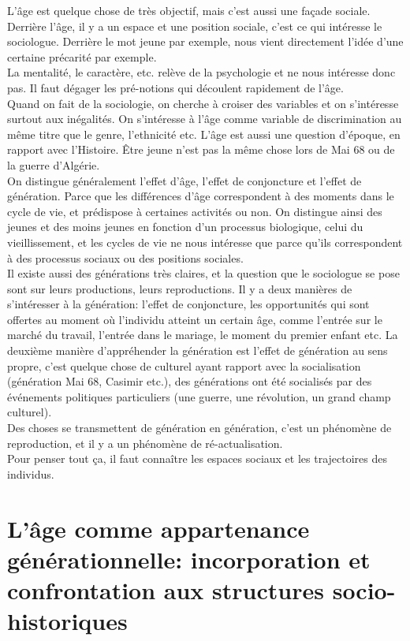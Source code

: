 \documentclass[10pt, a4paper, openany]{book}
\begin{document}
L'âge est quelque chose de très objectif, mais c'est aussi une façade sociale. Derrière l'âge, il y a un espace et une position sociale, c'est ce qui intéresse le sociologue. Derrière le mot jeune par exemple, nous vient directement l'idée d'une certaine précarité par exemple. \\
La mentalité, le caractère, etc. relève de la psychologie et ne nous intéresse donc pas. Il faut dégager les pré-notions qui découlent rapidement de l'âge. \\
Quand on fait de la sociologie, on cherche à croiser des variables et on s'intéresse surtout aux inégalités. On s'intéresse à l'âge comme variable de discrimination au même titre que le genre, l'ethnicité etc. L'âge est aussi une question d'époque, en rapport avec l'Histoire. Être jeune n'est pas la même chose lors de Mai 68 ou de la guerre d'Algérie. \\
On distingue généralement l'effet d'âge, l'effet de conjoncture et l'effet de génération. Parce que les différences d'âge correspondent à des moments dans le cycle de vie, et prédispose à certaines activités ou non. On distingue ainsi des jeunes et des moins jeunes en fonction d'un processus biologique, celui du vieillissement, et les cycles de vie ne nous intéresse que parce qu'ils correspondent à des processus sociaux ou des positions sociales. \\ 
Il existe aussi des générations très claires, et la question que le sociologue se pose sont sur leurs productions, leurs reproductions. Il y a deux manières de s'intéresser à la génération: l'effet de conjoncture, les opportunités qui sont offertes au moment où l'individu atteint un certain âge, comme l'entrée sur le marché du travail, l'entrée dans le mariage, le moment du premier enfant etc. La deuxième manière d'appréhender la génération est l'effet de génération au sens propre, c'est quelque chose de culturel ayant rapport avec la socialisation (génération Mai 68, Casimir etc.), des générations ont été socialisés par des événements politiques particuliers (une guerre, une révolution, un grand champ culturel). \\
Des choses se transmettent de génération en génération, c'est un phénomène de reproduction, et il y a un phénomène de ré-actualisation. \\
Pour penser tout ça, il faut connaître les espaces sociaux et les trajectoires des individus. 

\section{L'âge comme appartenance générationnelle: incorporation et confrontation aux structures socio-historiques}
\end{document}
